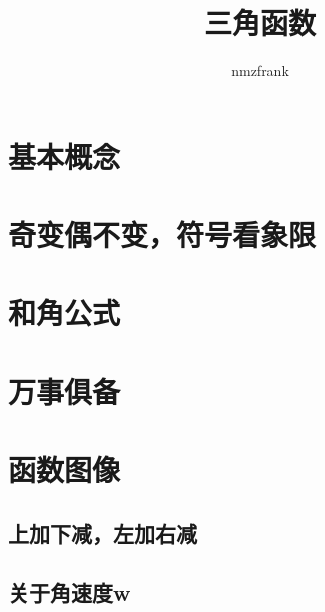 \documentclass[UTF8]{article}
\begin{document}
\title{三角函数}
\author{nmzfrank}
\maketitle
\section{基本概念}
\section{奇变偶不变，符号看象限}
\section{和角公式}
\section{万事俱备}
\section{函数图像}
\subsection{上加下减，左加右减}
\subsection{关于角速度w}
\end{document}
